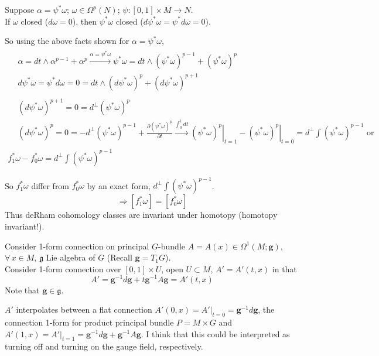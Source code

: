 \documentclass[10pt]{amsart}
\begin{document}
\begin{multicols}{2}
Suppose $\alpha = \psi^* \omega$; $\omega \in \Omega^p(N)$; $\psi : [0,1] \times M \to N$.  \\
If $\omega$ closed ($d\omega =0$), then $\psi^*\omega$ closed ($d\psi^* \omega = \psi^* d\omega =0$).  

So using the above facts shown for $\alpha = \psi^* \omega$,
\[
\begin{gathered}
\begin{aligned}
  & \alpha = dt \wedge \alpha^{p-1} + \alpha^p \xrightarrow{ \alpha = \psi^* \omega } \psi^* \omega = dt \wedge (\psi^* \omega)^{p-1} + (\psi^* \omega)^p \\ 
  &  d\psi^* \omega = \psi^* d\omega = 0 = dt \wedge (d\psi^* \omega)^p + (d\psi^* \omega)^{p+1}
\end{aligned} \\
\begin{aligned}
  &  (d\psi^* \omega)^{p+1} =0 = d^{\perp}(\psi^* \omega)^p \\ 
  & (d\psi^* \omega)^p = 0 = -d^{\perp}(\psi^* \omega)^{p-1} + \frac{ \partial ( \psi^* \omega)^p }{ \partial t} \xrightarrow{ \int_0^1 dt } \left. (\psi^* \omega)^p \right|_{t=1} - \left. (\psi^* \omega)^p \right|_{t=0} = d^{\perp} \int(\psi^* \omega)^{p-1} \text{ or } 
\end{aligned} \\
f_1^* \omega - f_0^* \omega = d^{\perp} \int (\psi^* \omega)^{p-1}
\end{gathered}
\]

So $f_1^* \omega$ differ from $f_0^* \omega$ by an exact form, $d^{\perp} \int(\psi^* \omega)^{p-1}$.  
\[
\Longrightarrow [f_1^* \omega] = [f_0^* \omega]
\]
Thus deRham cohomology classes are invariant under homotopy (homotopy invariant!).  

Consider 1-form connection on principal $G$-bundle $A=A(x) \in \Omega^1(M;\mathbf{g})$, $\forall \, x \in M$, $\mathfrak{g}$ Lie algebra of $G$ (Recall $\mathbf{g} = T_1G$).  \\
Consider 1-form connection over $[0,1] \times U$, open $U \subset M$, $A'=A'(t,x)$ in that
\[
A' = \mathbf{g}^{-1}d\mathbf{g} + t\mathbf{g}^{-1} A \mathbf{g} = A'(t,x)
\]
Note that $\mathbf{g} \in \mathfrak{g}$.  

$A'$ interpolates between a flat connection $A'(0,x) = \left. A' \right|_{t=0} = \mathbf{g}^{-1} d\mathbf{g}$, the connection 1-form for product principal bundle $P=M\times G$ and $A'(1,x) = \left. A'\right|_{t=1} = \mathbf{g}^{-1} d\mathbf{g} + \mathbf{g}^{-1} A \mathbf{g}$.  I think that this could be interpreted as turning off and turning on the gauge field, respectively.  


\end{multicols}
\end{document}
